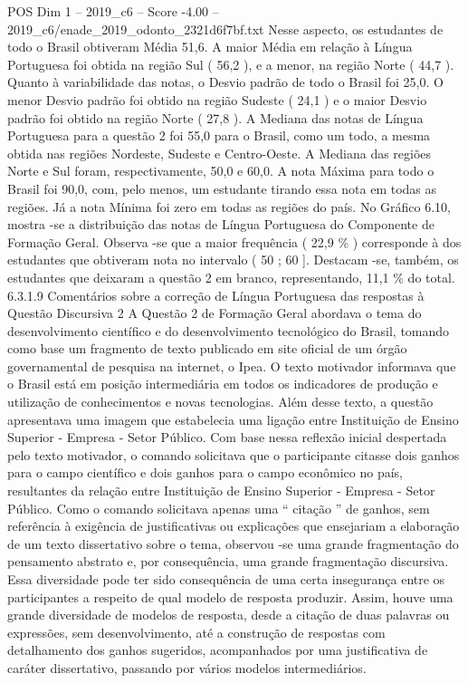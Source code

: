 \begin{textsample}{POS Dim 1 – 2019\_c6 – Score -4.00 – 2019\_c6/enade\_2019\_odonto\_2321d6f7bf.txt}
Nesse aspecto, os estudantes de todo o Brasil obtiveram Média 51,6.
A maior Média em relação à Língua Portuguesa foi obtida na região Sul ( 56,2 ), e a menor, na região Norte ( 44,7 ).
Quanto à variabilidade das notas, o Desvio padrão de todo o Brasil foi 25,0.
O menor Desvio padrão foi obtido na região Sudeste ( 24,1 ) e o maior Desvio padrão foi obtido na região Norte ( 27,8 ).
A Mediana das notas de Língua Portuguesa para a questão 2 foi 55,0 para o Brasil, como um todo, a mesma obtida nas regiões Nordeste, Sudeste e Centro-Oeste.
A Mediana das regiões Norte e Sul foram, respectivamente, 50,0 e 60,0.
A nota Máxima para todo o Brasil foi 90,0, com, pelo menos, um estudante tirando essa nota em todas as regiões.
Já a nota Mínima foi zero em todas as regiões do país.
No Gráfico 6.10, mostra -se a distribuição das notas de Língua Portuguesa do Componente de Formação Geral.
Observa -se que a maior frequência ( 22,9 \% ) corresponde à dos estudantes que obtiveram nota no intervalo ( 50 ; 60 ].
Destacam -se, também, os estudantes que deixaram a questão 2 em branco, representando, 11,1 \% do total. 6.3.1.9 Comentários sobre a correção de Língua Portuguesa das respostas à Questão Discursiva 2 A Questão 2 de Formação Geral abordava o tema do desenvolvimento científico e do desenvolvimento tecnológico do Brasil, tomando como base um fragmento de texto publicado em site oficial de um órgão governamental de pesquisa na internet, o Ipea.
O texto motivador informava que o Brasil está em posição intermediária em todos os indicadores de produção e utilização de conhecimentos e novas tecnologias.
Além desse texto, a questão apresentava uma imagem que estabelecia uma ligação entre Instituição de Ensino Superior - Empresa - Setor Público.
Com base nessa reflexão inicial despertada pelo texto motivador, o comando solicitava que o participante citasse dois ganhos para o campo científico e dois ganhos para o campo econômico no país, resultantes da relação entre Instituição de Ensino Superior - Empresa - Setor Público.
Como o comando solicitava apenas uma “ citação ” de ganhos, sem referência à exigência de justificativas ou explicações que ensejariam a elaboração de um texto dissertativo sobre o tema, observou -se uma grande fragmentação do pensamento abstrato e, por consequência, uma grande fragmentação discursiva.
Essa diversidade pode ter sido consequência de uma certa insegurança entre os participantes a respeito de qual modelo de resposta produzir.
Assim, houve uma grande diversidade de modelos de resposta, desde a citação de duas palavras ou expressões, sem desenvolvimento, até a construção de respostas com detalhamento dos ganhos sugeridos, acompanhados por uma justificativa de caráter dissertativo, passando por vários modelos intermediários.

\end{textsample}
